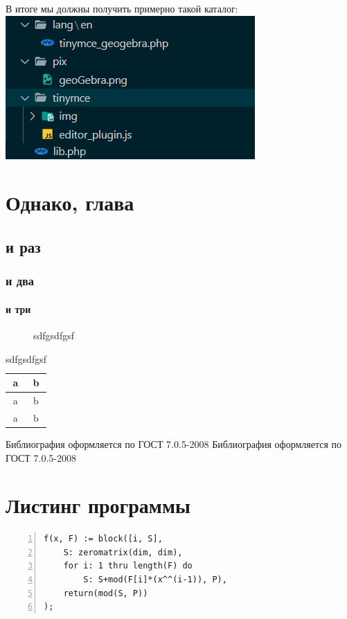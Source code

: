 \documentclass[14pt,Diplom]{diplomwork}
\newcommand{\alert}[1]{{\color{red}#1}}
\begin{document}
В итоге мы должны получить примерно такой каталог:\\

\includegraphics[width=0.5\linewidth]{1.png}



 
\chapter{Однако, глава}
\section{и раз}
\subsection{и два}
\subsubsection{и три}
\begin{figure}[H]
	\caption{sdfgsdfgsf}
	\label{fig:wqewe}
\end{figure}

\begin{table}[H]
	\caption{sdfgsdfgsf}
	\label{tbl:wqewe}
	\begin{tabular}{|c|c|}
		\hline
		a & b \\
		\hline
		a & b \\
		\hline
		a & b \\
		\hline
	\end{tabular}
\end{table}





\begin{thebibliography}{99}
 \alert{Библиография оформляется по ГОСТ 7.0.5-2008} 
 \alert{Библиография оформляется по ГОСТ 7.0.5-2008} 
\end{thebibliography}

\APPENDIX
\chapter{Листинг программы}
\linespread{1}

\begin{Verbatim}[numbers=left,firstnumber=last,fontsize=\small]
f(x, F) := block([i, S], 
    S: zeromatrix(dim, dim), 
    for i: 1 thru length(F) do
        S: S+mod(F[i]*(x^^(i-1)), P), 
    return(mod(S, P))
);
\end{Verbatim}  
\end{document}
